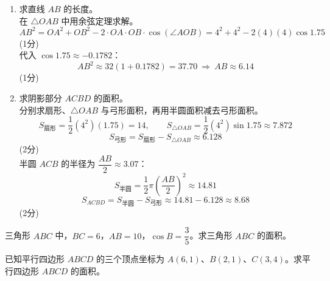 \documentclass[12pt,a4paper]{exam-zh}
\newcommand{\qscore}[1]{%
    \unskip\nobreak\hfill
    \makebox[0pt][l]{\makebox[4em][r]{(#1\%)}}%
}
\begin{document}
\begin{solution}
    \begin{enumerate}[label=(\alph*)]
        \item 求直线 $AB$ 的长度。 \\
        在 $\triangle OAB$ 中用余弦定理求解。
        \[
            \displaystyle AB^{2} = OA^{2} + OB^{2} - 2\cdot OA\cdot OB\cdot\cos(\angle AOB) = 4^{2}+4^{2}-2(4)(4)\cos 1.75
        \] \hfill (1分) \\
        代入 $\cos 1.75 \approx -0.1782$：
        \[
            \displaystyle AB^{2} \approx 32(1+0.1782) = 37.70 \ \Longrightarrow\ AB \approx 6.14
        \] \hfill (1分)

        \item 求阴影部分 $ACBD$ 的面积。 \\
        分别求扇形、$\triangle OAB$ 与弓形面积，再用半圆面积减去弓形面积。
        \[
            \displaystyle S_{\text{扇形}} = \frac{1}{2}(4^{2})(1.75) = 14,\qquad S_{\triangle OAB} = \frac{1}{2}(4^{2})\sin 1.75 \approx 7.872
        \]
        \[
            \displaystyle S_{\text{弓形}} = S_{\text{扇形}} - S_{\triangle OAB} \approx 6.128
        \] \hfill (2分) \\
        半圆 $ACB$ 的半径为 $\dfrac{AB}{2}\approx 3.07$：
        \[
            \displaystyle S_{\text{半圆}} = \frac{1}{2}\pi\left(\frac{AB}{2}\right)^{2} \approx 14.81
        \]
        \[
            \displaystyle S_{ACBD} = S_{\text{半圆}} - S_{\text{弓形}} \approx 14.81 - 6.128 \approx 8.68
        \] \hfill (2分)
    \end{enumerate}
\end{solution}

\begin{question}[points = 10]
    \begin{questionparts}
        \item 三角形 $ABC$ 中，$BC = 6$，$AB = 10$，$\cos B = \dfrac{3}{5}$。求三角形 $ABC$ 的面积。\qscore{4}

        \item 已知平行四边形 $ABCD$ 的三个顶点坐标为 $A(6, 1)$、$B(2, 1)$、$C(3, 4)$。求平行四边形 $ABCD$ 的面积。\qscore{4}
    \end{questionparts}
\end{question}
\end{document}
